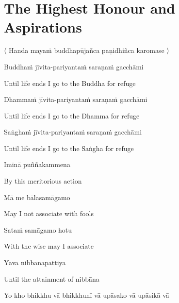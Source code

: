 

\section{The Highest Honour and Aspirations}
\label{highest-honour-aspirations}

\begin{leader}
  〈 Handa mayaṁ buddhapūjañca paṇidhiñca karomase 〉
\end{leader}

Buddhaṁ jīvita-pariyantaṁ saraṇaṁ gacchāmi

\begin{english}
  Until life ends I go to the Buddha for refuge
\end{english}

Dhammaṁ jīvita-pariyantaṁ saraṇaṁ gacchāmi

\begin{english}
  Until life ends I go to the Dhamma for refuge
\end{english}

Saṅghaṁ jīvita-pariyantaṁ saraṇaṁ gacchāmi

\begin{english}
  Until life ends I go to the Saṅgha for refuge
\end{english}

Iminā puññakammena

\begin{english}
  By this meritorious action
\end{english}

Mā me bālasamāgamo

\begin{english}
  May I not associate with fools
\end{english}

Sataṁ samāgamo hotu

\begin{english}
  With the wise may I associate
\end{english}

Yāva nibbānapattiyā

\begin{english}
  Until the attainment of nibbāna
\end{english}


Yo kho bhikkhu vā bhikkhunī vā upāsako vā upāsikā vā

